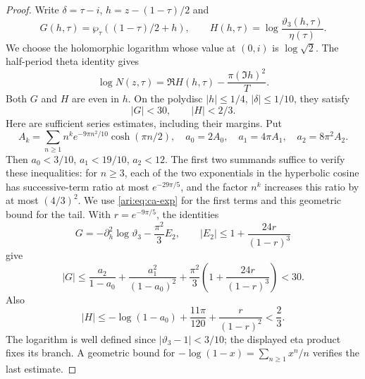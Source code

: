 \begin{proof}
Write $\delta=\tau-i$, $h=z-(1-\tau)/2$ and
\[
 G(h,\tau)=\wp_\tau((1-\tau)/2+h),\qquad
 H(h,\tau)=\log\frac{\vartheta_3(h,\tau)}{\eta(\tau)}.
\]
We choose the holomorphic logarithm whose value at $(0,i)$ is
$\log\sqrt2$. The half-period theta identity gives
\begin{equation}\label{ari:eq:ca-H}
 \log N(z,\tau)=\Re H(h,\tau)-\frac{\pi(\Im h)^2}{T}.
\end{equation}
Both $G$ and $H$ are even in $h$. On the polydisc
$|h|\le1/4$, $|\delta|\le1/10$, they satisfy
\begin{equation}\label{ari:eq:ca-GHbounds}
 |G|<30,\qquad |H|<2/3.
\end{equation}
Here are sufficient series estimates, including their margins.
Put
\[
 A_k=\sum_{n\ge1}n^k e^{-9\pi n^2/10}\cosh(\pi n/2),
 \quad a_0=2A_0,\quad a_1=4\pi A_1,\quad a_2=8\pi^2A_2.
\]
Then $a_0<3/10$, $a_1<19/10$, $a_2<12$.
The first two summands suffice to verify these inequalities: for
$n\ge3$, each of the two exponentials in the hyperbolic cosine
has successive-term ratio at most $e^{-29\pi/5}$, and the
factor $n^k$ increases this ratio by at most $(4/3)^2$.
We use \eqref{ari:eq:ca-exp} for the first terms and this geometric
bound for the tail. With $r=e^{-9\pi/5}$, the identities
\[
 G=-\partial_h^2\log\vartheta_3-\frac{\pi^2}{3}E_2,
 \qquad
 |E_2|\le1+\frac{24r}{(1-r)^3}
\]
give
\[
 |G|\le\frac{a_2}{1-a_0}+\frac{a_1^2}{(1-a_0)^2}
       +\frac{\pi^2}{3}\left(1+\frac{24r}{(1-r)^3}\right)<30.
\]
Also
\[
 |H|\le-\log(1-a_0)+\frac{11\pi}{120}
                    +\frac{r}{(1-r)^2}<\frac23.
\]
The logarithm is well defined since $|\vartheta_3-1|<3/10$;
the displayed eta product fixes its branch. A geometric bound
for $-\log(1-x)=\sum_{n\ge1}x^n/n$ verifies the last estimate.


\end{proof}
